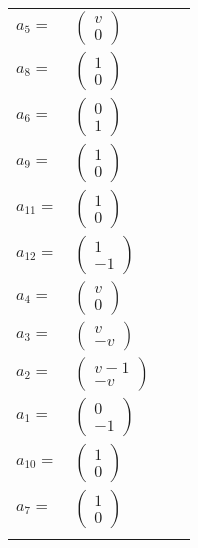 \documentclass[1p]{elsarticle_modified}
\theoremstyle{definition}
\begin{document}
\begin{tabular}{m{7pt} m{180pt} m{7pt} m{180pt} }
\flushright $a_{5}=$&$\begin{pmatrix}v\\0\end{pmatrix}$ \\
\flushright $a_{8}=$&$\begin{pmatrix}1\\0\end{pmatrix}$ \\
\flushright $a_{6}=$&$\begin{pmatrix}0\\1\end{pmatrix}$ \\
\flushright $a_{9}=$&$\begin{pmatrix}1\\0\end{pmatrix}$ \\
\flushright $a_{11}=$&$\begin{pmatrix}1\\0\end{pmatrix}$ \\
\flushright $a_{12}=$&$\begin{pmatrix}1\\-1\end{pmatrix}$ \\
\flushright $a_{4}=$&$\begin{pmatrix}v\\0\end{pmatrix}$ \\
\flushright $a_{3}=$&$\begin{pmatrix}v\\- v\end{pmatrix}$ \\
\flushright $a_{2}=$&$\begin{pmatrix}v-1\\- v\end{pmatrix}$ \\
\flushright $a_{1}=$&$\begin{pmatrix}0\\-1\end{pmatrix}$ \\
\flushright $a_{10}=$&$\begin{pmatrix}1\\0\end{pmatrix}$ \\
\flushright $a_{7}=$&$\begin{pmatrix}1\\0\end{pmatrix}$\\&\end{tabular}
\end{document}
